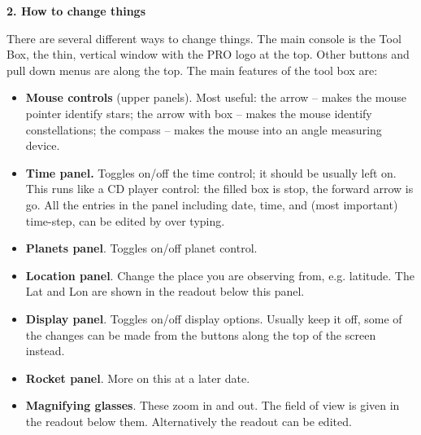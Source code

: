 \documentclass[12pt]{article}
\begin{document}
\medskip
\noindent
{\bf 2. How to change things}

\smallskip
\noindent
There are several different ways to change things. The main console is
the Tool Box, the thin, vertical window with the PRO logo at the top. Other buttons and pull
down menus are along the top. The main features of the tool box are:

\begin{itemize}
\item {\bf Mouse controls} (upper panels).  Most useful: the arrow --
makes the mouse
pointer identify stars; the arrow with box -- makes the mouse identify
constellations; the compass -- makes the mouse into an angle measuring device.

\item {\bf Time panel.} Toggles on/off the time control; it should be
usually left on.  This runs like a CD player control: the filled box
is stop, the forward arrow is go. All the entries in the panel
including date, time, and (most important) time-step, can be edited by
over typing.

\item {\bf Planets panel}. Toggles on/off planet control.

\item {\bf Location panel}. Change the place you are observing from,
e.g. latitude. The Lat and Lon are shown in the readout below this panel.

\item {\bf Display panel}. Toggles on/off display options. Usually keep it
off, some of the changes can be made from the buttons along the top of
the screen instead.

\item {\bf Rocket panel}. More on this at a later date.

\item {\bf Magnifying glasses}. These zoom in and  out. The field of
view is given in the readout below them. Alternatively the readout can
be edited. 


\end{itemize}
\end{document}
